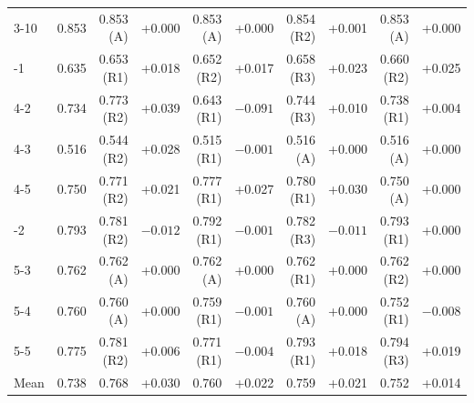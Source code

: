 \documentclass[a4paper,fleqn]{cas-dc}
\begin{document}
\begin{table}[t]
\begin{tabular*}{\textwidth}{@{\extracolsep{\fill}} l r rr rr rr rr}
3-10 & 0.853 & 0.853 (A) & +0.000 & 0.853 (A) & +0.000 & 0.854 (R2) & +0.001 & 0.853 (A) & +0.000 \\
\addlinespace
4-1 & 0.635 & 0.653 (R1) & +0.018 & 0.652 (R2) & +0.017 & 0.658 (R3) & +0.023 & 0.660 (R2) & +0.025 \\
4-2 & 0.734 & 0.773 (R2) & +0.039 & 0.643 (R1) & $-0.091$ & 0.744 (R3) & +0.010 & 0.738 (R1) & +0.004 \\
4-3 & 0.516 & 0.544 (R2) & +0.028 & 0.515 (R1) & $-0.001$ & 0.516 (A) & +0.000 & 0.516 (A) & +0.000 \\
4-5 & 0.750 & 0.771 (R2) & +0.021 & 0.777 (R1) & +0.027 & 0.780 (R1) & +0.030 & 0.750 (A) & +0.000 \\
\addlinespace
5-2 & 0.793 & 0.781 (R2) & $-0.012$ & 0.792 (R1) & $-0.001$ & 0.782 (R3) & $-0.011$ & 0.793 (R1) & +0.000 \\
5-3 & 0.762 & 0.762 (A) & +0.000 & 0.762 (A) & +0.000 & 0.762 (R1) & +0.000 & 0.762 (R2) & +0.000 \\
5-4 & 0.760 & 0.760 (A) & +0.000 & 0.759 (R1) & $-0.001$ & 0.760 (A) & +0.000 & 0.752 (R1) & $-0.008$ \\
5-5 & 0.775 & 0.781 (R2) & +0.006 & 0.771 (R1) & $-0.004$ & 0.793 (R1) & +0.018 & 0.794 (R3) & +0.019 \\
\midrule
Mean & 0.738 & 0.768 & +0.030 & 0.760 & +0.022 & 0.759 & +0.021 & 0.752 & +0.014 \\
\bottomrule
\end{tabular*}
\end{table}

\clearpage
\end{document}

